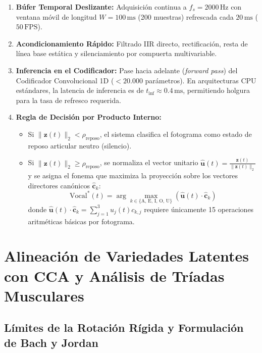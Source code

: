 \documentclass[11pt,a4paper]{article}
\begin{document}
\begin{enumerate}
    \item \textbf{Búfer Temporal Deslizante:} Adquisición continua a $f_s = 2000\,\text{Hz}$ con ventana móvil de longitud $W = 100\,\text{ms}$ (200 muestras) refrescada cada $20\,\text{ms}$ ($50\,\text{FPS}$).
    \item \textbf{Acondicionamiento Rápido:} Filtrado IIR directo, rectificación, resta de línea base estática y silenciamiento por compuerta multivariable.
    \item \textbf{Inferencia en el Codificador:} Pase hacia adelante (\textit{forward pass}) del Codificador Convolucional 1D ($< 20.000$ parámetros). En arquitecturas CPU estándares, la latencia de inferencia es de $t_{\text{inf}} \approx 0.4\,\text{ms}$, permitiendo holgura para la tasa de refresco requerida.
    \item \textbf{Regla de Decisión por Producto Interno:}
    \begin{itemize}
        \item Si $\|\mathbf{z}(t)\|_2 < \rho_{\text{reposo}}$, el sistema clasifica el fotograma como estado de reposo articular neutro (silencio).
        \item Si $\|\mathbf{z}(t)\|_2 \ge \rho_{\text{reposo}}$, se normaliza el vector unitario $\hat{\mathbf{u}}(t) = \frac{\mathbf{z}(t)}{\|\mathbf{z}(t)\|_2}$ y se asigna el fonema que maximiza la proyección sobre los vectores directores canónicos $\hat{\mathbf{c}}_k$:
        \begin{equation}
            \text{Vocal}^*(t) = \arg\max_{k \in \{\text{A, E, I, O, U}\}} \left( \hat{\mathbf{u}}(t) \cdot \hat{\mathbf{c}}_k \right)
            \label{eq:regla_decision}
        \end{equation}
        donde $\hat{\mathbf{u}}(t) \cdot \hat{\mathbf{c}}_k = \sum_{j=1}^3 u_j(t) c_{k,j}$ requiere únicamente 15 operaciones aritméticas básicas por fotograma.
    \end{itemize}
\end{enumerate}

\section{Alineación de Variedades Latentes con CCA y Análisis de Tríadas Musculares}
\label{sec:cca_triadas}

\subsection{Límites de la Rotación Rígida y Formulación de Bach y Jordan}
\label{subsec:limites_so_d}
\end{document}
